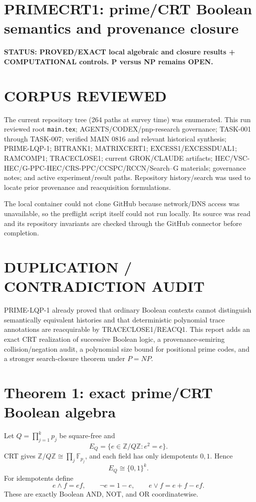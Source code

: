 \documentclass[11pt]{article}
\begin{document}
\section*{PRIMECRT1: prime/CRT Boolean semantics and provenance closure}
\textbf{STATUS: PROVED/EXACT local algebraic and closure results + COMPUTATIONAL controls. P versus NP remains OPEN.}

\section*{CORPUS REVIEWED}
The current repository tree (264 paths at survey time) was enumerated. This run reviewed root \texttt{main.tex}; AGENTS/CODEX/pnp-research governance; TASK-001 through TASK-007; verified MAIN 0816 and relevant historical synthesis; PRIME-LQP-1; BITRANK1; MATRIXCERT1; EXCESS1/EXCESSDUAL1; RAMCOMP1; TRACECLOSE1; current GROK/CLAUDE artifacts; HEC/VSC-HEC/G-PPC-HEC/CRS-PPC/CCSPC/RCCN/Search--G materials; governance notes; and active experiment/result paths. Repository history/search was used to locate prior provenance and reacquisition formulations.

The local container could not clone GitHub because network/DNS access was unavailable, so the preflight script itself could not run locally. Its source was read and its repository invariants are checked through the GitHub connector before completion.

\section*{DUPLICATION / CONTRADICTION AUDIT}
PRIME-LQP-1 already proved that ordinary Boolean contexts cannot distinguish semantically equivalent histories and that deterministic polynomial trace annotations are reacquirable by TRACECLOSE1/REACQ1. This report adds an exact CRT realization of successive Boolean logic, a provenance-semiring collision/negation audit, a polynomial size bound for positional prime codes, and a stronger search-closure theorem under \(P=NP\).

\section*{Theorem 1: exact prime/CRT Boolean algebra}
Let \(Q=\prod_{j=1}^{k}p_j\) be square-free and
\[
E_Q=\{e\in\mathbb Z/Q\mathbb Z:e^2=e\}.
\]
CRT gives \(\mathbb Z/Q\mathbb Z\cong\prod_j\mathbb F_{p_j}\), and each field has only idempotents \(0,1\). Hence
\[
E_Q\cong\{0,1\}^{k}.
\]
For idempotents define
\[
e\wedge f=ef,\qquad \neg e=1-e,\qquad e\vee f=e+f-ef.
\]
These are exactly Boolean AND, NOT, and OR coordinatewise.
\end{document}
